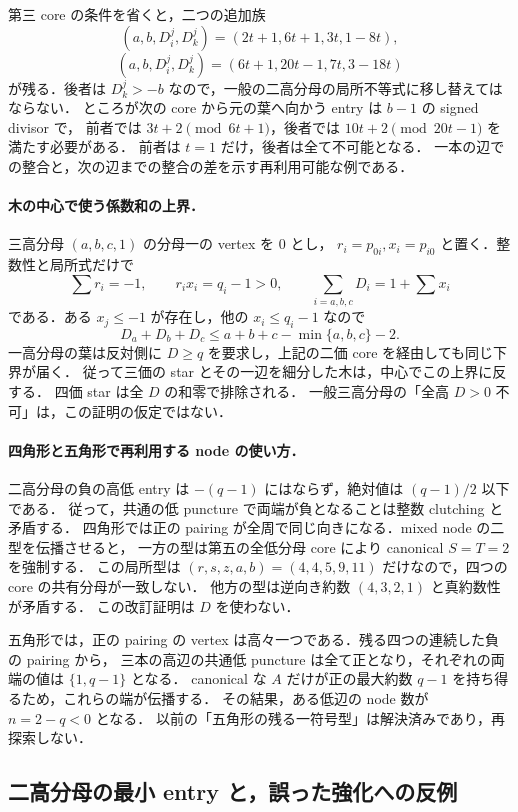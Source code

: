 第三 core の条件を省くと，二つの追加族
\[
 (a,b,D^j_i,D^j_k)=(2t+1,6t+1,3t,1-8t),
\]
\[
 (a,b,D^j_i,D^j_k)=(6t+1,20t-1,7t,3-18t)
\]
が残る．後者は $D^j_k>-b$ なので，一般の二高分母の局所不等式に移し替えてはならない．
ところが次の core から元の葉へ向かう entry は $b-1$ の signed divisor で，
前者では $3t+2\pmod{6t+1}$，後者では $10t+2\pmod{20t-1}$ を満たす必要がある．
前者は $t=1$ だけ，後者は全て不可能となる．
一本の辺での整合と，次の辺までの整合の差を示す再利用可能な例である．

\paragraph{木の中心で使う係数和の上界．}
三高分母 $(a,b,c,1)$ の分母一の vertex を $0$ とし，
$r_i=p_{0i},x_i=p_{i0}$ と置く．整数性と局所式だけで
\[
 \sum r_i=-1,\qquad r_ix_i=q_i-1>0,\qquad
 \sum_{i=a,b,c}D_i=1+\sum x_i
\]
である．ある $x_j\leq-1$ が存在し，他の $x_i\leq q_i-1$ なので
\[
 D_a+D_b+D_c\leq a+b+c-\min\{a,b,c\}-2.
\]
一高分母の葉は反対側に $D\geq q$ を要求し，上記の二価 core を経由しても同じ下界が届く．
従って三価の star とその一辺を細分した木は，中心でこの上界に反する．
四価 star は全 $D$ の和零で排除される．
一般三高分母の「全高 $D>0$ 不可」は，この証明の仮定ではない．

\paragraph{四角形と五角形で再利用する node の使い方．}
二高分母の負の高低 entry は $-(q-1)$ にはならず，絶対値は $(q-1)/2$ 以下である．
従って，共通の低 puncture で両端が負となることは整数 clutching と矛盾する．
四角形では正の pairing が全周で同じ向きになる．mixed node の二型を伝播させると，
一方の型は第五の全低分母 core により canonical $S=T=2$ を強制する．
この局所型は $(r,s,z,a,b)=(4,4,5,9,11)$ だけなので，四つの core の共有分母が一致しない．
他方の型は逆向き約数 $(4,3,2,1)$ と真約数性が矛盾する．
この改訂証明は $D$ を使わない．

五角形では，正の pairing の vertex は高々一つである．残る四つの連続した負の pairing から，
三本の高辺の共通低 puncture は全て正となり，それぞれの両端の値は $\{1,q-1\}$ となる．
canonical な $A$ だけが正の最大約数 $q-1$ を持ち得るため，これらの端が伝播する．
その結果，ある低辺の node 数が $n=2-q<0$ となる．
以前の「五角形の残る一符号型」は解決済みであり，再探索しない．

\subsection{二高分母の最小 entry と，誤った強化への反例}

